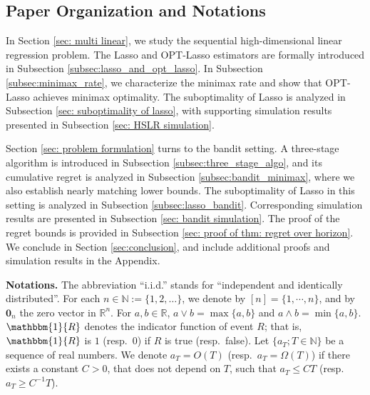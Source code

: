 \documentclass[aos,preprint]{imsart}
\theoremstyle{plain}
\theoremstyle{definition}
\newcommand{\bd}[1]{\boldsymbol{#1}}
\newcommand{\idf}{\mathbbm{1}}
\newcommand{\bR}{\mathbb{R}}
\begin{document}
\subsection{Paper Organization and Notations}
In Section \ref{sec: multi linear}, we study the sequential high-dimensional linear regression problem. The Lasso and OPT-Lasso estimators are formally introduced in Subsection \ref{subsec:lasso_and_opt_lasso}. In Subsection \ref{subsec:minimax_rate}, we characterize the minimax rate and show that OPT-Lasso achieves minimax optimality. The suboptimality of Lasso is analyzed in Subsection \ref{sec: suboptimality of lasso}, with supporting simulation results presented in Subsection \ref{sec: HSLR simulation}.

Section \ref{sec: problem formulation} turns to the bandit setting. A three-stage algorithm is introduced in Subsection \ref{subsec:three_stage_algo}, and its cumulative regret is analyzed in Subsection \ref{subsec:bandit_minimax}, where we also establish nearly matching lower bounds. The suboptimality of Lasso in this setting is analyzed in Subsection \ref{subsec:lasso_bandit}. Corresponding simulation results are presented in Subsection \ref{sec: bandit simulation}. The proof of the regret bounds is provided in Subsection \ref{sec: proof of thm: regret over horizon}. We conclude in Section \ref{sec:conclusion}, and include additional proofs and simulation results in the Appendix.

\smallskip
\noindent \textbf{Notations.} The abbreviation ``i.i.d.'' stands for ``independent and identically distributed''. For each $n\in \mathbb{N} := \{1,2,\ldots\}$, we denote by $[n]=\{1,\cdots, n\}$, and by $\bd{0}_n$ the zero vector in $\bR^{n}$. For $a,b \in \bR$, $a \vee b= \max\{a,b\}$ and $a\wedge b = \min\{a,b\}$.  $\idf\{R\}$ denotes the indicator function of event $R$; that is,  $\idf\{R\}$ is $1$ (resp.~$0$) if $R$ is true (resp.~false). 
Let $\{a_T; T \in \mathbb{N}\}$ be a sequence of real numbers. We denote $a_T=O(T)$ (resp.~$a_T=\Omega(T)$) if there exists a constant $C>0$, that does not depend on $T$, such that $a_T \le C T$ (resp.~$a_T \ge C^{-1} T$). 
\end{document}
